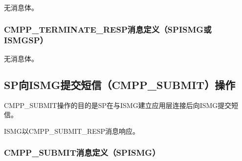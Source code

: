\documentclass[11pt]{book} %
\begin{document}
无消息体。


\subsubsection{CMPP\_TERMINATE\_RESP消息定义（SP\textrightarrow ISMG或ISMG\textrightarrow SP）}

无消息体。


\subsection{SP向ISMG提交短信（CMPP\_SUBMIT）操作}

CMPP\_SUBMIT操作的目的是SP在与ISMG建立应用层连接后向ISMG提交短信。

ISMG以CMPP\_SUBMIT\_RESP消息响应。


\subsubsection{CMPP\_SUBMIT消息定义（SP\textrightarrow ISMG）}
\end{document}
